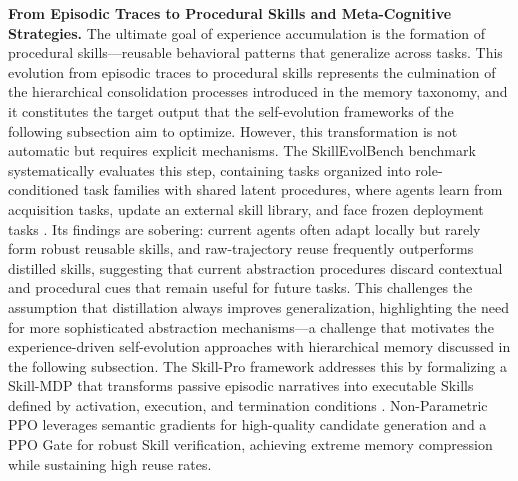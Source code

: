 \documentclass[11pt]{article}
\begin{document}
\textbf{From Episodic Traces to Procedural Skills and Meta-Cognitive Strategies.} The ultimate goal of experience accumulation is the formation of procedural skills---reusable behavioral patterns that generalize across tasks. This evolution from episodic traces to procedural skills represents the culmination of the hierarchical consolidation processes introduced in the memory taxonomy, and it constitutes the target output that the self-evolution frameworks of the following subsection aim to optimize. However, this transformation is not automatic but requires explicit mechanisms. The SkillEvolBench benchmark systematically evaluates this step, containing tasks organized into role-conditioned task families with shared latent procedures, where agents learn from acquisition tasks, update an external skill library, and face frozen deployment tasks \cite{ref140}. Its findings are sobering: current agents often adapt locally but rarely form robust reusable skills, and raw-trajectory reuse frequently outperforms distilled skills, suggesting that current abstraction procedures discard contextual and procedural cues that remain useful for future tasks. This challenges the assumption that distillation always improves generalization, highlighting the need for more sophisticated abstraction mechanisms---a challenge that motivates the experience-driven self-evolution approaches with hierarchical memory discussed in the following subsection. The Skill-Pro framework addresses this by formalizing a Skill-MDP that transforms passive episodic narratives into executable Skills defined by activation, execution, and termination conditions \cite{ref141}. Non-Parametric PPO leverages semantic gradients for high-quality candidate generation and a PPO Gate for robust Skill verification, achieving extreme memory compression while sustaining high reuse rates.
\end{document}
